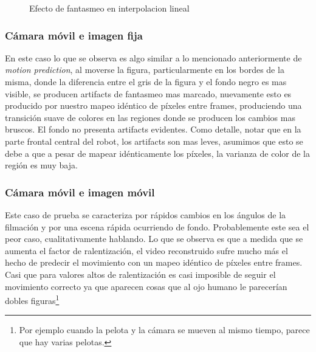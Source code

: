 \begin{figure}[H]
    \centering
    \caption{Efecto de fantasmeo en interpolacion lineal}
    \label{fig:artifact}
\end{figure}

\subsubsection{Cámara móvil e imagen fija}
En este caso lo que se observa es algo similar a lo mencionado anteriormente de \emph{motion prediction}, al moverse la figura, particularmente en los bordes de la misma, donde la diferencia entre el gris de la figura y el fondo negro es mas visible, se producen artifacts de fantasmeo mas marcado, nuevamente esto es producido por nuestro mapeo idéntico de píxeles entre frames, produciendo una transición suave de colores en las regiones donde se producen los cambios mas bruscos. El fondo no presenta artifacts evidentes. Como detalle, notar que en la parte frontal central del robot, los artifacts son mas leves, asumimos que esto se debe a que a pesar de mapear idénticamente los píxeles, la varianza de color de la región es muy baja.

\subsubsection{Cámara móvil e imagen móvil}
Este caso de prueba se caracteriza por rápidos cambios en los ángulos de la filmación y por una escena rápida ocurriendo de fondo. Probablemente este sea el peor caso, cualitativamente hablando. Lo que se observa es que a medida que se aumenta el factor de ralentización, el video reconstruido sufre mucho más el hecho de predecir el movimiento con un mapeo idéntico de píxeles entre frames. Casi que para valores altos de ralentización es casi imposible de seguir el movimiento correcto ya que aparecen cosas que al ojo humano le parecerían dobles figuras\footnote{Por ejemplo cuando la pelota y la cámara se mueven al mismo tiempo, parece que hay varias pelotas.}

